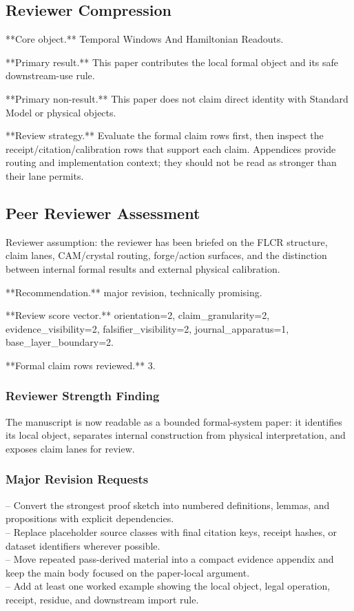 \documentclass[11pt]{article}
\begin{document}
\subsection*{Reviewer Compression}

**Core object.** Temporal Windows And Hamiltonian Readouts.

**Primary result.** This paper contributes the local formal object and its safe downstream-use rule.

**Primary non-result.** This paper does not claim direct identity with Standard Model or physical objects.

**Review strategy.** Evaluate the formal claim rows first, then inspect the receipt/citation/calibration rows that support each claim. Appendices provide routing and implementation context; they should not be read as stronger than their lane permits.

\subsection*{Peer Reviewer Assessment}

Reviewer assumption: the reviewer has been briefed on the FLCR structure, claim lanes, CAM/crystal routing, forge/action surfaces, and the distinction between internal formal results and external physical calibration.

**Recommendation.** major revision, technically promising.

**Review score vector.** orientation=2, claim\_granularity=2, evidence\_visibility=2, falsifier\_visibility=2, journal\_apparatus=1, base\_layer\_boundary=2.

**Formal claim rows reviewed.** 3.

\subsubsection*{Reviewer Strength Finding}

The manuscript is now readable as a bounded formal-system paper: it identifies its local object, separates internal construction from physical interpretation, and exposes claim lanes for review.

\subsubsection*{Major Revision Requests}

\noindent{}-- Convert the strongest proof sketch into numbered definitions, lemmas, and propositions with explicit dependencies.\\
\noindent{}-- Replace placeholder source classes with final citation keys, receipt hashes, or dataset identifiers wherever possible.\\
\noindent{}-- Move repeated pass-derived material into a compact evidence appendix and keep the main body focused on the paper-local argument.\\
\noindent{}-- Add at least one worked example showing the local object, legal operation, receipt, residue, and downstream import rule.\\
\end{document}
